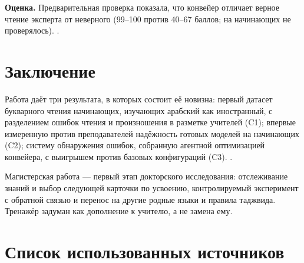 \documentclass[a4paper,14pt,oneside]{extreport}
\newcommand{\annsection}[1]{\section*{#1}}
\begin{document}
\textbf{Оценка.} Предварительная проверка показала, что конвейер отличает верное чтение эксперта от
неверного (99--100 против 40--67 баллов; на начинающих не проверялось). .


\annsection{Заключение}

Работа даёт три результата, в которых состоит её новизна: первый датасет букварного чтения начинающих,
изучающих арабский как иностранный, с разделением ошибок чтения и произношения в разметке учителей (C1);
впервые измеренную против преподавателей надёжность готовых моделей на начинающих (C2);
систему обнаружения ошибок, собранную агентной оптимизацией конвейера, с выигрышем против базовых конфигураций (C3).
.

Магистерская работа --- первый этап докторского исследования: отслеживание знаний и выбор следующей карточки по усвоению,
контролируемый эксперимент с обратной связью и перенос на другие родные языки и правила таджвида. Тренажёр задуман как дополнение к учителю, а не замена ему.

\annsection{Список использованных источников}
\printbibliography[heading=none]
\end{document}
